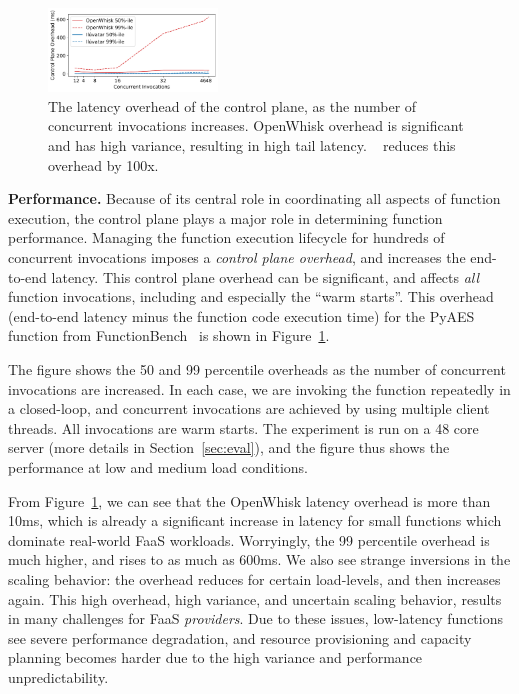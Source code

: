 \begin{figure}
  \centering  \includegraphics[width=0.4\textwidth]{iluvatar/graphs/scaling/pyaes/overhead-scaling.pdf}
  \caption{The latency overhead of the control plane, as the number of concurrent invocations increases. OpenWhisk overhead is significant and has high variance, resulting in high tail latency. \sysname~ reduces this overhead by 100x. }
  \label{fig:ow-scaling}
\end{figure}


\noindent \textbf{Performance.}
%
Because of its central role in coordinating all aspects of function execution, the control plane plays a major role in determining function performance. 
Managing the function execution lifecycle for hundreds of concurrent invocations imposes a \emph{control plane overhead}, and increases the end-to-end latency.
This control plane overhead can be significant, and affects \emph{all} function invocations, including and especially the ``warm starts''. 
This overhead (end-to-end latency minus the function code execution time) for the PyAES function from FunctionBench~\cite{kim2019functionbench} is shown in Figure~\ref{fig:ow-scaling}. 

The figure shows the 50 and 99 percentile overheads as the number of concurrent invocations are increased.
In each case, we are invoking the function repeatedly in a closed-loop, and concurrent invocations are achieved by using multiple client threads.
All invocations are warm starts.
The experiment is run on a 48 core server (more details in Section~\ref{sec:eval}), and the figure thus shows the performance at low and medium load conditions. 

From Figure~\ref{fig:ow-scaling}, we can see that the OpenWhisk latency overhead is more than 10ms,  which is already a significant increase in latency for small functions which dominate real-world FaaS workloads.
Worryingly, the 99 percentile overhead is much higher, and rises to as much as 600ms.
We also see strange inversions in the scaling behavior: the overhead reduces for certain load-levels, and then increases again.
This high overhead, high variance, and uncertain scaling behavior, results in many challenges for FaaS \emph{providers}. 
Due to these issues, low-latency functions see severe performance degradation, and resource provisioning and capacity planning becomes harder due to the high variance and performance unpredictability. 
%

